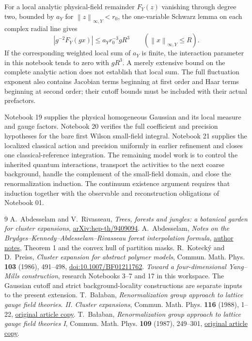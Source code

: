 \documentclass[11pt]{article}
\theoremstyle{remark}
\newcommand{\norm}[1]{\left\|#1\right\|}
\begin{document}
For a local analytic physical-field remainder $F_Y(z)$ vanishing
through degree two, bounded by $a_Y$ for $\norm z_{\infty,Y}<r_0$,
the one-variable Schwarz lemma on each complex radial line gives
\[
 |g^{-2}F_Y(gx)|\le a_Yr_0^{-3}gR^3
       \qquad (\norm x_{\infty,Y}\le R).
\]
If the corresponding weighted local sum of $a_Y$ is finite,
the interaction parameter in this notebook tends to zero with
$gR^3$. A merely extensive bound on the complete analytic action
does not establish that local sum. The full fluctuation exponent
also contains Jacobian terms beginning at first order and Haar
terms beginning at second order; their cutoff bounds must be
included with their actual prefactors.

Notebook 19 supplies the physical homogeneous Gaussian and its
local measure and gauge factors. Notebook 20 verifies the full
coefficient and precision hypotheses for the bare first Wilson
small-field integral. Notebook 21 supplies the localized
classical action and precision uniformly in earlier refinement
and closes one classical-reference integration. The remaining
model work is to control the inherited quantum interactions,
transport the activities to the next coarse background,
handle the complement of the small-field domain, and close the
renormalization induction. The continuum existence argument
requires that induction together with the observable and
reconstruction obligations of Notebook 01.

\begin{thebibliography}{9}
A.~Abdesselam and V.~Rivasseau,
\emph{Trees, forests and jungles: a botanical garden for cluster
expansions}, \href{https://arxiv.org/abs/hep-th/9409094}{arXiv:hep-th/9409094}.
A.~Abdesselam,
\emph{Notes on the Brydges--Kennedy--Abdesselam--Rivasseau
forest interpolation formula},
\href{https://mabdesselam.github.io/BKAR.pdf}{author notes},
Theorem 1 and the convex hull of partition masks.
R.~Koteck\'y and D.~Preiss,
\emph{Cluster expansion for abstract polymer models},
Commun. Math. Phys. \textbf{103} (1986), 491--498,
\href{https://doi.org/10.1007/BF01211762}{doi:10.1007/BF01211762}.
\emph{Toward a four-dimensional Yang--Mills construction},
research Notebooks 3--7 and 17 in this workspace.
The Gaussian cutoff and strict background-locality constructions
are separate inputs to the present extension.
T.~Ba\l aban,
\emph{Renormalization group approach to lattice gauge field
theories. II. Cluster expansions},
Commun. Math. Phys. \textbf{116} (1988), 1--22,
\href{https://scispace.com/pdf/renormalization-group-approach-to-lattice-gauge-field-4penm4k7hc.pdf}{original article copy}.
T.~Ba\l aban,
\emph{Renormalization group approach to lattice gauge field
theories I}, Commun. Math. Phys. \textbf{109} (1987), 249--301,
\href{https://scispace.com/pdf/renormalization-group-approach-to-lattice-gauge-field-3ygai0vxt1.pdf}{original article copy}.
\end{thebibliography}
\end{document}
